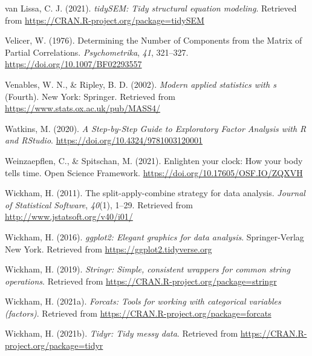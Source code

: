 \documentclass[
  english,
  man]{apa6}
\newlength{\cslhangindent}
\newlength{\cslentryspacingunit} %
\newenvironment{CSLReferences}[2] %
 {%
  \setlength{\parindent}{0pt}
  \ifodd #1
  \let\oldpar\par
  \def\par{\hangindent=\cslhangindent\oldpar}
  \fi
  \setlength{\parskip}{#2\cslentryspacingunit}
 }%
 {}
\begin{document}
\begin{CSLReferences}{1}{0}
\leavevmode{}%
van Lissa, C. J. (2021). \emph{tidySEM: Tidy structural equation modeling}. Retrieved from \url{https://CRAN.R-project.org/package=tidySEM}

\leavevmode{}%
Velicer, W. (1976). Determining the {Number} of {Components} from the {Matrix} of {Partial Correlations}. \emph{Psychometrika}, \emph{41}, 321--327. \url{https://doi.org/10.1007/BF02293557}

\leavevmode{}%
Venables, W. N., \& Ripley, B. D. (2002). \emph{Modern applied statistics with s} (Fourth). New York: Springer. Retrieved from \url{https://www.stats.ox.ac.uk/pub/MASS4/}

\leavevmode{}%
Watkins, M. (2020). \emph{A {Step}-by-{Step Guide} to {Exploratory Factor Analysis} with {R} and {RStudio}}. \url{https://doi.org/10.4324/9781003120001}

\leavevmode{}%
Weinzaepflen, C., \& Spitschan, M. (2021). Enlighten your clock: How your body tells time. {Open Science Framework}. \url{https://doi.org/10.17605/OSF.IO/ZQXVH}

\leavevmode{}%
Wickham, H. (2011). The split-apply-combine strategy for data analysis. \emph{Journal of Statistical Software}, \emph{40}(1), 1--29. Retrieved from \url{http://www.jstatsoft.org/v40/i01/}

\leavevmode{}%
Wickham, H. (2016). \emph{ggplot2: Elegant graphics for data analysis}. Springer-Verlag New York. Retrieved from \url{https://ggplot2.tidyverse.org}

\leavevmode{}%
Wickham, H. (2019). \emph{Stringr: Simple, consistent wrappers for common string operations}. Retrieved from \url{https://CRAN.R-project.org/package=stringr}

\leavevmode{}%
Wickham, H. (2021a). \emph{Forcats: Tools for working with categorical variables (factors)}. Retrieved from \url{https://CRAN.R-project.org/package=forcats}

\leavevmode{}%
Wickham, H. (2021b). \emph{Tidyr: Tidy messy data}. Retrieved from \url{https://CRAN.R-project.org/package=tidyr}


\end{CSLReferences}
\end{document}
